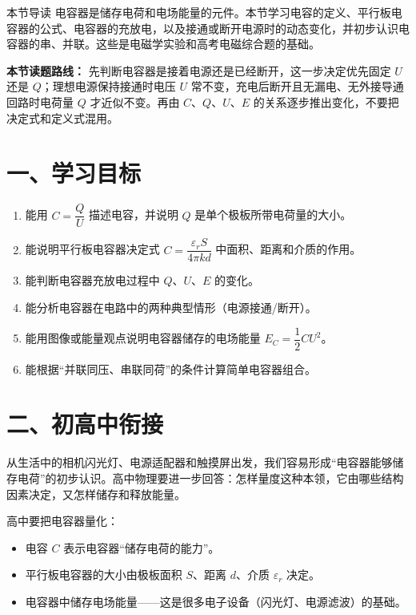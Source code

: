 
\begin{learningbox}{本节导读}
电容器是储存电荷和电场能量的元件。本节学习电容的定义、平行板电容器的公式、电容器的充放电，以及接通或断开电源时的动态变化，并初步认识电容器的串、并联。这些是电磁学实验和高考电磁综合题的基础。
\end{learningbox}

\textbf{本节读题路线：} 先判断电容器是接着电源还是已经断开，这一步决定优先固定 $U$ 还是 $Q$；理想电源保持接通时电压 $U$ 常不变，充电后断开且无漏电、无外接导通回路时电荷量 $Q$ 才近似不变。再由 $C$、$Q$、$U$、$E$ 的关系逐步推出变化，不要把决定式和定义式混用。

\section*{一、学习目标}

\begin{enumerate}
  \item 能用 $C = \dfrac{Q}{U}$ 描述电容，并说明 $Q$ 是单个极板所带电荷量的大小。
  \item 能说明平行板电容器决定式 $C = \dfrac{\varepsilon_r S}{4\pi k d}$ 中面积、距离和介质的作用。
  \item 能判断电容器充放电过程中 $Q$、$U$、$E$ 的变化。
  \item 能分析电容器在电路中的两种典型情形（电源接通/断开）。
  \item 能用图像或能量观点说明电容器储存的电场能量 $E_C = \dfrac12 CU^2$。
  \item 能根据“并联同压、串联同荷”的条件计算简单电容器组合。
\end{enumerate}
\section*{二、初高中衔接}

从生活中的相机闪光灯、电源适配器和触摸屏出发，我们容易形成“电容器能够储存电荷”的初步认识。高中物理要进一步回答：怎样量度这种本领，它由哪些结构因素决定，又怎样储存和释放能量。

高中要把电容器量化：
\begin{itemize}
  \item 电容 $C$ 表示电容器“储存电荷的能力”。
  \item 平行板电容器的大小由极板面积 $S$、距离 $d$、介质 $\varepsilon_r$ 决定。
  \item 电容器中储存电场能量——这是很多电子设备（闪光灯、电源滤波）的基础。
\end{itemize}


